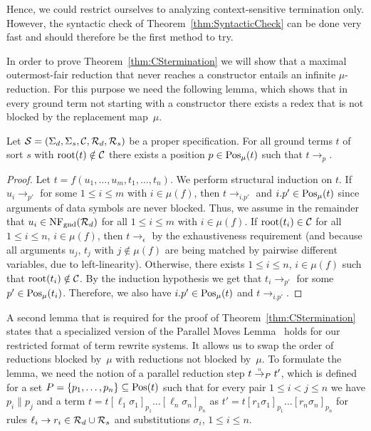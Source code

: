 \documentclass{eptcs}
\begin{document}
Hence, we could restrict ourselves to analyzing context-sensitive termination
only. However, the syntactic check of Theorem~\ref{thm:SyntacticCheck} can be
done very fast and should therefore be the first method to try.

In order to prove Theorem~\ref{thm:CStermination} we will show that a maximal
outermost-fair reduction that never reaches a constructor entails an infinite
$\mu$-reduction.
For this purpose we need the following lemma,
which shows that in every ground term not starting with a constructor there
exists a redex that is not blocked by the replacement map~$\mu$.

\begin{lemma}
\label{lem:ExistRedex}
Let $\mathcal{S} = (\Sigma_d,\Sigma_s,\mathcal{C},\mathcal{R}_d,\mathcal{R}_s)$ be a proper specification.
For all ground terms $t$ of sort $s$ with $\mathrm{root}(t) \notin \mathcal{C}$ there exists a
position $p \in \mathrm{Pos}_\mu(t)$ such that $t \to_{p}$.
\end{lemma}

\begin{proof}
Let $t = f(u_1, \dotsc, u_m, t_1, \dotsc, t_n)$. We perform structural induction
on $t$.
If $u_i \to_{p'}$ for some $1 \le i \le m$ with $i \in \mu(f)$, then
$t \to_{i.p'}$ and $i.p' \in \mathrm{Pos}_\mu(t)$ since arguments of data symbols are
never blocked.
Thus, we assume in the remainder that
$u_i \in \mathrm{NF}_{\mathrm{gnd}}(\mathcal{R}_d)$ for all $1 \le i \le m$ with $i \in \mu(f)$.
If $\mathrm{root}(t_i) \in \mathcal{C}$ for all $1 \le i \le n$, $i \in \mu(f)$, then
$t \to_{\epsilon}$ by the exhaustiveness requirement (and because all arguments
$u_j$, $t_j$ with $j \notin \mu(f)$ are being matched by pairwise different
variables, due to left-linearity).
Otherwise, there exists $1 \le i \le n$, $i \in \mu(f)$ such that
$\mathrm{root}(t_i) \notin \mathcal{C}$. By the induction hypothesis we get that $t_i \to_{p'}$
for some $p' \in \mathrm{Pos}_\mu(t_i)$. Therefore, we also have
$i.p' \in \mathrm{Pos}_\mu(t)$ and $t \to_{i.p'}$.
\end{proof}


A second lemma that is required for the proof of Theorem~\ref{thm:CStermination}
states that a specialized version of the
Parallel Moves Lemma~\cite[Lemma~6.4.4]{BN98}
holds for our restricted format of term rewrite systems.
It allows us to swap the order of reductions blocked by~$\mu$ with reductions
not blocked by~$\mu$.
To formulate the lemma, we need the notion of a parallel reduction step
$t \mathrel{\smash{\overset{\shortparallel}{\rightarrow}}}_P t'$, which is defined for a set
$P = \{ p_1, \dotsc, p_n \} \subseteq \mathrm{Pos}(t)$ such that for every pair
$1 \le i < j \le n$ we have $p_i \parallel p_j$
and a term
$t = t[\ell_1\sigma_1]_{p_1} \ldots [\ell_n\sigma_n]_{p_n}$ as
$t' = t[r_1\sigma_1]_{p_1} \ldots [r_n\sigma_n]_{p_n}$ for rules
$\ell_i \to r_i \in \mathcal{R}_d \cup \mathcal{R}_s$ and substitutions $\sigma_i$,
$1 \le i \le n$.
\end{document}
